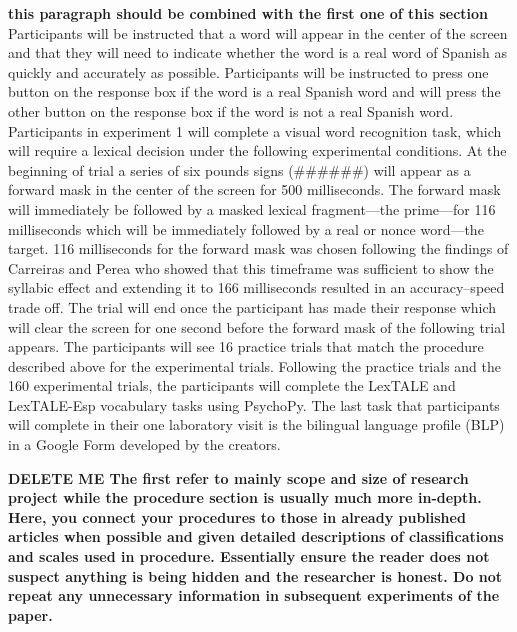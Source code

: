 \textbf{this paragraph should be combined with the first one of this section}
Participants will be instructed that a word will appear in the center of the screen and that they will need to indicate whether the word is a real word of Spanish as quickly and accurately as possible. Participants will be instructed to press one button on the response box if the word is a real Spanish word and will press the other button on the response box if the word is not a real Spanish word. Participants in experiment 1 will complete a visual word recognition task, which will require a lexical decision under the following experimental conditions. At the beginning of trial a series of six pounds signs (\#\#\#\#\#\#) will appear as a forward mask in the center of the screen for 500 milliseconds. The forward mask will immediately be followed by a masked lexical fragment—the prime—for 116 milliseconds which will be immediately followed by a real or nonce word—the target. 116 milliseconds for the forward mask was chosen following the findings of Carreiras and Perea \parencite*{Carreiras2002-mp} who showed that this timeframe was sufficient to show the syllabic effect and extending it to 166 milliseconds resulted in an accuracy–speed trade off. The trial will end once the participant has made their response which will clear the screen for one second before the forward mask of the following trial appears. The participants will see 16 practice trials that match the procedure described above for the experimental trials. Following the practice trials and the 160 experimental trials, the participants will complete the LexTALE and LexTALE-Esp vocabulary tasks using PsychoPy. The last task that participants will complete in their one laboratory visit is the bilingual language profile (BLP) in a Google Form developed by the creators.



\textbf{DELETE ME The first refer to mainly scope and size of research project while the procedure section is usually much more in-depth. Here, you connect your procedures to those in already published articles when possible and given detailed descriptions of classifications and scales used in procedure. Essentially ensure the reader does not suspect anything is being hidden and the researcher is honest. Do not repeat any unnecessary information in subsequent experiments of the paper.}



